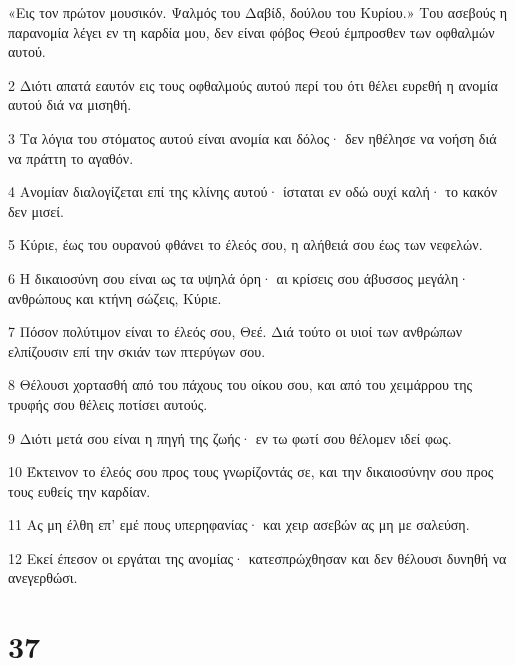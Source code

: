 \par «Εις τον πρώτον μουσικόν. Ψαλμός του Δαβίδ, δούλου του Κυρίου.» Του ασεβούς η παρανομία λέγει εν τη καρδία μου, δεν είναι φόβος Θεού έμπροσθεν των οφθαλμών αυτού.
\par 2 Διότι απατά εαυτόν εις τους οφθαλμούς αυτού περί του ότι θέλει ευρεθή η ανομία αυτού διά να μισηθή.
\par 3 Τα λόγια του στόματος αυτού είναι ανομία και δόλος· δεν ηθέλησε να νοήση διά να πράττη το αγαθόν.
\par 4 Ανομίαν διαλογίζεται επί της κλίνης αυτού· ίσταται εν οδώ ουχί καλή· το κακόν δεν μισεί.
\par 5 Κύριε, έως του ουρανού φθάνει το έλεός σου, η αλήθειά σου έως των νεφελών.
\par 6 Η δικαιοσύνη σου είναι ως τα υψηλά όρη· αι κρίσεις σου άβυσσος μεγάλη· ανθρώπους και κτήνη σώζεις, Κύριε.
\par 7 Πόσον πολύτιμον είναι το έλεός σου, Θεέ. Διά τούτο οι υιοί των ανθρώπων ελπίζουσιν επί την σκιάν των πτερύγων σου.
\par 8 Θέλουσι χορτασθή από του πάχους του οίκου σου, και από του χειμάρρου της τρυφής σου θέλεις ποτίσει αυτούς.
\par 9 Διότι μετά σου είναι η πηγή της ζωής· εν τω φωτί σου θέλομεν ιδεί φως.
\par 10 Έκτεινον το έλεός σου προς τους γνωρίζοντάς σε, και την δικαιοσύνην σου προς τους ευθείς την καρδίαν.
\par 11 Ας μη έλθη επ' εμέ πους υπερηφανίας· και χειρ ασεβών ας μη με σαλεύση.
\par 12 Εκεί έπεσον οι εργάται της ανομίας· κατεσπρώχθησαν και δεν θέλουσι δυνηθή να ανεγερθώσι.

\chapter{37}

